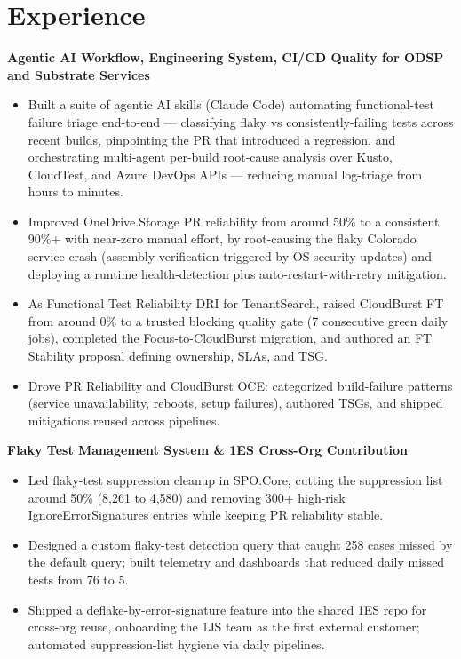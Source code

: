 \documentclass{resume}
\begin{document}



\section{Experience}

\textbf{Agentic AI Workflow, Engineering System, CI/CD Quality for ODSP and Substrate Services }
\begin{itemize}
  \item Built a suite of agentic AI skills (Claude Code) automating functional-test failure triage end-to-end — classifying flaky vs consistently-failing tests across recent builds, pinpointing the PR that introduced a regression, and orchestrating multi-agent per-build root-cause analysis over Kusto, CloudTest, and Azure DevOps APIs — reducing manual log-triage from hours to minutes.
  \item Improved OneDrive.Storage PR reliability from around 50\% to a consistent 90\%+ with near-zero manual effort, by root-causing the flaky Colorado service crash (assembly verification triggered by OS security updates) and deploying a runtime health-detection plus auto-restart-with-retry mitigation.
  \item As Functional Test Reliability DRI for TenantSearch, raised CloudBurst FT from around 0\% to a trusted blocking quality gate (7 consecutive green daily jobs), completed the Focus-to-CloudBurst migration, and authored an FT Stability proposal defining ownership, SLAs, and TSG.
  \item Drove PR Reliability and CloudBurst OCE: categorized build-failure patterns (service unavailability, reboots, setup failures), authored TSGs, and shipped mitigations reused across pipelines.
\end{itemize}

\textbf{Flaky Test Management System \& 1ES Cross-Org Contribution}
\begin{itemize}
  \item Led flaky-test suppression cleanup in SPO.Core, cutting the suppression list around 50\% (8,261 to 4,580) and removing 300+ high-risk IgnoreErrorSignatures entries while keeping PR reliability stable.
  \item Designed a custom flaky-test detection query that caught 258 cases missed by the default query; built telemetry and dashboards that reduced daily missed tests from 76 to 5.
  \item Shipped a deflake-by-error-signature feature into the shared 1ES repo for cross-org reuse, onboarding the 1JS team as the first external customer; automated suppression-list hygiene via daily pipelines.
\end{itemize}
\end{document}
